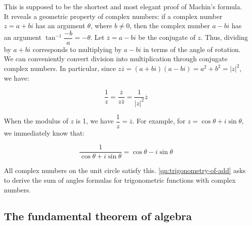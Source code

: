 \documentclass[b5paper]{article}
\begin{document}
This is supposed to be the shortest and most elegant proof of Machin's formula. It reveals a geometric property of complex numbers: if a complex number $z = a + bi$ has an argument $\theta$, where $b \ne 0$, then the complex number $a - bi$ has an argument $\tan^{-1}\dfrac{-b}{a} = -\theta$. Let $\overline{z} = a - bi$ be the conjugate of $z$. Thus, dividing by $a + bi$ corresponds to multiplying by $a - bi$ in terms of the angle of rotation. We can conveniently convert division into multiplication through conjugate complex numbers. In particular, since $z\overline{z} = (a + bi)(a - bi) = a^2 + b^2 = |z|^2$, we have:

\[
\frac{1}{z} = \frac{\overline{z}}{z\overline{z}} = \frac{1}{|z|^2}\overline{z}
\]

When the modulus of $z$ is 1, we have $\dfrac{1}{z} = \overline{z}$. For example, for $z = \cos\theta + i\sin\theta$, we immediately know that:

\[
\frac{1}{\cos\theta + i\sin\theta} = \cos\theta - i\sin\theta
\]

All complex numbers on the unit circle satisfy this. \cref{qn:trigonometry-of-add} asks to derive the sum of angles formulas for trigonometric functions with complex numbers.

\subsection{The fundamental theorem of algebra}
\end{document}

